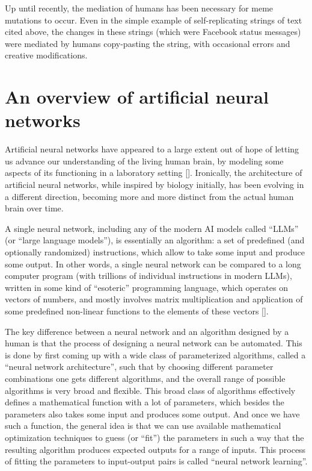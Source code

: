 \documentclass[12pt]{article}
\newcommand{\citestrut}[1]{\vphantom{[}{#1}\vphantom{]}}
\renewcommand{\cite}[1]{[\hyperlink{#1}{\citestrut{#1}}]}
\begin{document}
Up until recently, the mediation of humans has been necessary for meme mutations to
occur. Even in the simple example of self-replicating strings of text cited above, the
changes in these strings (which were Facebook status messages) were mediated by humans
copy-pasting the string, with occasional errors and creative modifications.

\section{An overview of artificial neural networks}

Artificial neural networks have appeared to a large extent out of hope of letting us
advance our understanding of the living human brain, by modeling some aspects of its
functioning in a laboratory setting \cite{GeoffreyHinton}. Ironically, the architecture
of artificial neural networks, while inspired by biology initially, has been evolving in
a different direction, becoming more and more distinct from the actual human brain over
time.

A single neural network, including any of the modern AI models called ``LLMs'' (or
``large language models''), is essentially an algorithm: a set of predefined (and
optionally randomized) instructions, which allow to take some input and produce some
output. In other words, a single neural network can be compared to a long computer
program (with trillions of individual instructions in modern LLMs), written in some kind
of ``esoteric'' programming language, which operates on vectors of numbers, and mostly
involves matrix multiplication and application of some predefined non-linear functions to
the elements of these vectors \cite{3Blue1Brown}.

The key difference between a neural network and an algorithm designed by a human is that
the process of designing a neural network can be automated. This is done by first coming
up with a wide class of parameterized algorithms, called a ``neural network
architecture'', such that by choosing different parameter combinations one gets different
algorithms, and the overall range of possible algorithms is very broad and flexible. This
broad class of algorithms effectively defines a mathematical function with a lot of
parameters, which besides the parameters also takes some input and produces some output.
And once we have such a function, the general idea is that we can use available
mathematical optimization techniques to guess (or ``fit'') the parameters in such a way
that the resulting algorithm produces expected outputs for a range of inputs. This
process of fitting the parameters to input-output pairs is called ``neural network
learning''.
\end{document}
